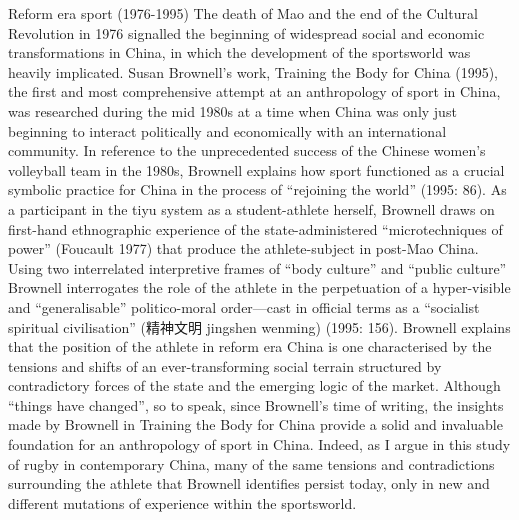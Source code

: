 Reform era sport (1976-1995)
The death of Mao and the end of the Cultural Revolution in 1976 signalled the beginning of widespread social and economic transformations in China, in which the development of the sportsworld was heavily implicated.  Susan Brownell’s work, Training the Body for China (1995), the first and most comprehensive attempt at an anthropology of sport in China, was researched during the mid 1980s at a time when China was only just beginning to interact politically and economically with an international community.  In reference to the unprecedented success of the Chinese women’s volleyball team in the 1980s, Brownell explains how sport functioned as a crucial symbolic practice for China in the process of “rejoining the world” (1995: 86).  As a participant in the tiyu system as a student-athlete herself, Brownell draws on first-hand ethnographic experience of the state-administered “microtechniques of power” (Foucault 1977) that produce the athlete-subject in post-Mao China.  Using two interrelated interpretive frames of “body culture” and “public culture” Brownell interrogates the role of the athlete in the perpetuation of a hyper-visible and “generalisable” politico-moral order—cast in official terms as a “socialist spiritual civilisation” (精神文明 jingshen wenming) (1995: 156).  Brownell explains that the position of the athlete in reform era China is one characterised by the tensions and shifts of an ever-transforming social terrain structured by contradictory forces of the state and the emerging logic of the market.  Although “things have changed”, so to speak, since Brownell’s time of writing, the insights made by Brownell in Training the Body for China provide a solid and invaluable foundation for an anthropology of sport in China.  Indeed, as I argue in this study of rugby in contemporary China, many of the same tensions and contradictions surrounding the athlete that Brownell identifies persist today, only in new and different mutations of experience within the sportsworld.

